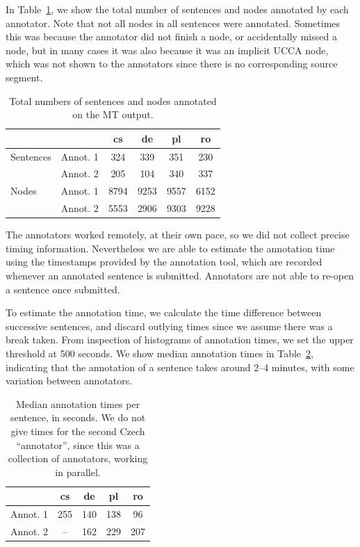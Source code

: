 \documentclass[11pt]{article}
\newcommand{\tabref}[1]{Table~\ref{#1}}
\begin{document}
In \tabref{tab:annot},
we show the total number of sentences and nodes annotated by each annotator. Note that not all nodes in all sentences were annotated. Sometimes this was because the
annotator did not finish a node, or accidentally missed a node, but in many cases it was also because it was an implicit 
UCCA node, which was not shown to the annotators since there is no corresponding source segment.
\begin{table}
\begin{center}
{\small
\begin{tabular}{ll|cccc}
& & cs & de & pl & ro \\
\hline
Sentences &  Annot. 1 & 324   & 339  & 351  & 230  \\
 & Annot. 2 & 205 & 104  & 340  & 337 \\
\hline
Nodes & Annot. 1 & 8794  & 9253 & 9557  & 6152 \\
 &Annot. 2 & 5553 & 2906  & 9303  & 9228  \\
\end{tabular}
}
\caption{Total numbers of sentences and nodes annotated on the MT output.}
\label{tab:annot}
\end{center}
\end{table}

The annotators worked remotely, at their own pace, so we did not collect precise timing
information. Nevertheless we are able to estimate the annotation time using the timestamps
provided by the annotation tool, which are recorded whenever an annotated sentence is
submitted. Annotators are not able to re-open a sentence once submitted. 

To estimate the annotation time, we calculate the time difference between successive 
sentences, and discard outlying times since we assume there was a break taken. From inspection
of histograms of annotation times, we set the upper threshold at 500 seconds. We
show median annotation times in Table~\ref{tab:annot_times}, indicating that the annotation
of a sentence takes around 2--4 minutes, with some variation between annotators.

\begin{table}
\begin{center}
\begin{tabular}{l|cccc}
& cs & de & pl & ro \\
\hline
Annot. 1 & 255 & 140  & 138 & 96 \\
Annot. 2 & -- & 162 & 229 & 207 \\
\end{tabular}
\caption{Median annotation times per sentence, in seconds.
We do not give times for the second Czech 
``annotator'', since this was a collection of annotators, working in parallel.}
\label{tab:annot_times}
\end{center}
\end{table}
\end{document}
